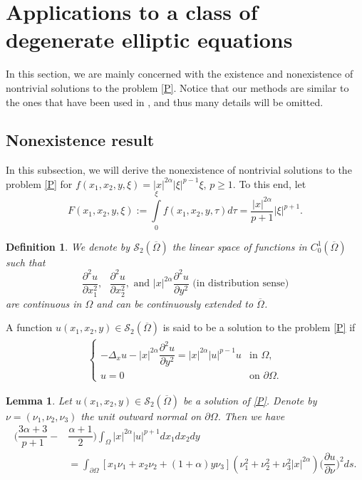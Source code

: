 \documentclass[10pt, reqno]{amsart}
\newtheorem{lemma}{Lemma}
\newtheorem{definition}{Definition}
\begin{document}
	
	\section{Applications to a class of degenerate elliptic equations}\label{sec4}
	In this section, we are mainly concerned with the existence and nonexistence of nontrivial solutions to the problem \eqref{P}. Notice that our methods are similar to the ones that have been used in \cite{Luyen2}, and thus many details will be omitted. 
	
	\subsection{Nonexistence result}\label{sec41}
	In this subsection, we will derive the nonexistence of nontrivial solutions to the problem \eqref{P} for $f(x_1,x_2, y, \xi) = |x|^{2\alpha} |\xi|^{p-1} \xi$, $p  \geq 1$. To this end, let
	$$ F(x_1,x_2,y,\xi) := \int\limits_0^\xi f(x_1,x_2,y,\tau)d\tau = \dfrac{|x|^{2\alpha}}{p+1} |\xi|^{p+1}. $$
	
	\begin{definition}\label{defextra}
		We denote by $\mathcal{S}_2(\overline{\Omega})$ the linear space of functions in $C_0^1 (\overline{\Omega})$ such that
		$$\dfrac{\partial^2 u}{\partial x_1^2}, \textrm{ } \dfrac{\partial^2 u}{\partial x_2^2}, \textrm{ and } |x|^{2\alpha} \dfrac{\partial^2 u}{\partial y^2} \textrm{ (in distribution sense)}$$ 
		are continuous in $\Omega$ and can be continuously extended to $\overline{\Omega}$.
	\end{definition}
	
	A function $u(x_1,x_2,y) \in \mathcal{S}_2(\overline{\Omega})$ is said to be a solution to the problem \eqref{P} if
	\begin{align*}
		\begin{cases}
			- \Delta_x u - |x|^{2\alpha} \dfrac{\partial^2 u}{\partial y^2} = |x|^{2\alpha}|u|^{p-1}u & \textrm{in } \Omega, \\
			u = 0 & \textrm{on } \partial \Omega.
		\end{cases}
	\end{align*}
	
	
	\begin{lemma}\label{lem3}
		Let $u(x_1,x_2,y)\in\mathcal{S}_2(\overline{\Omega})$ be a solution of \eqref{P}. Denote by $\nu = (\nu_1,\nu_2,\nu_3)$ the unit outward normal on $\partial\Omega$. Then we have
		\begin{align}
			\label{eqn21}
			\nonumber
			\bigg(\dfrac{3\alpha+3}{p+1}-&\dfrac{\alpha+1}{2}\bigg)\int_\Omega |x|^{2\alpha}|u|^{p+1}dx_1dx_2dy \\
			& = \int_{\partial\Omega} [x_1\nu_1+x_2\nu_2 + (1+\alpha)y\nu_3](\nu_1^2+\nu_2^2 + \nu_3^2 |x|^{2\alpha}) \bigg( \dfrac{\partial u }{\partial \nu}\bigg)^2 ds.
		\end{align}
	\end{lemma}
	
\end{document}
